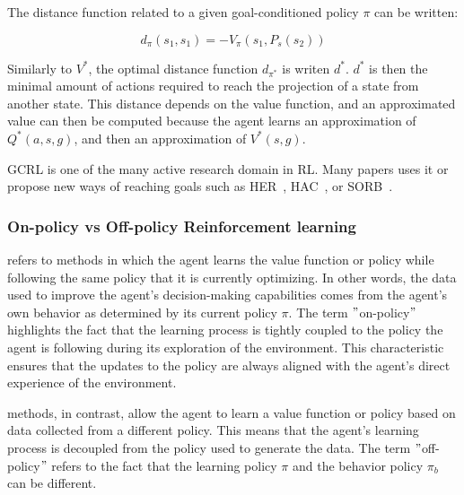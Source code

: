 The distance function related to a given goal-conditioned policy $\pi$ can be written:

\begin{equation} \label{eq:bg:rl:uvfa-distance}
    d_\pi(s_1, s_1) = - V_\pi(s_1, P_s(s_2))
\end{equation}

Similarly to $V^*$, the optimal distance function $d_{\pi^*}$ is writen $d^*$.
$d^*$ is then the minimal amount of actions required to reach the projection of a state from another state.
This distance depends on the value function, and an approximated value can then be computed because the agent learns an
approximation of $Q^*(a, s, g)$, and then an approximation of $V^*(s, g)$.

GCRL is one of the many active research domain in RL.
Many papers uses it or propose new ways of reaching goals such as HER~\citep{andrychowicz2017hindsight},
HAC~\cite{levy2019learning}, or SORB~\cite{eysenbach2019search}.


\subsubsection{On-policy vs Off-policy Reinforcement learning}\label{subsection:bg:rl:on-off-policy}

 refers to methods in which the agent learns the value function or policy while
following the same policy that it is currently optimizing.
In other words, the data used to improve the agent's decision-making capabilities comes from the agent’s own behavior
as determined by its current policy $\pi$.
The term \("\)on-policy\("\) highlights the fact that the learning process is tightly coupled to the policy the agent is
following during its exploration of the environment.
This characteristic ensures that the updates to the policy are always aligned with the agent's direct experience of the
environment.

 methods, in contrast, allow the agent to learn a value function or policy based on
data collected from a different policy.
This means that the agent's learning process is decoupled from the policy used to generate the data.
The term \("\)off-policy\("\) refers to the fact that the learning policy $\pi$ and the behavior policy $\pi_b$ can be
different.

